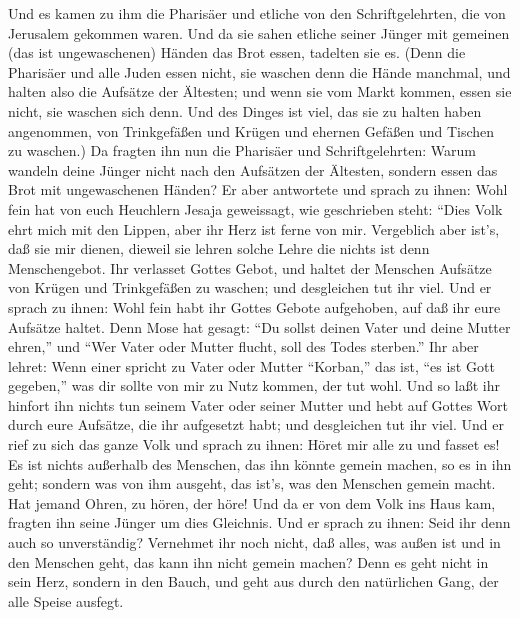  Und es kamen zu ihm die Pharisäer und etliche von den
Schriftgelehrten, die von Jerusalem gekommen waren.  Und da
sie sahen etliche seiner Jünger mit gemeinen (das ist ungewaschenen)
Händen das Brot essen, tadelten sie es.  (Denn die Pharisäer
und alle Juden essen nicht, sie waschen denn die Hände manchmal, und
halten also die Aufsätze der Ältesten;  und wenn sie vom
Markt kommen, essen sie nicht, sie waschen sich denn. Und des Dinges ist
viel, das sie zu halten haben angenommen, von Trinkgefäßen und Krügen
und ehernen Gefäßen und Tischen zu waschen.)  Da fragten ihn
nun die Pharisäer und Schriftgelehrten: Warum wandeln deine Jünger nicht
nach den Aufsätzen der Ältesten, sondern essen das Brot mit
ungewaschenen Händen?  Er aber antwortete und sprach zu
ihnen: Wohl fein hat von euch Heuchlern Jesaja geweissagt, wie
geschrieben steht: ``Dies Volk ehrt mich mit den Lippen, aber ihr Herz
ist ferne von mir.  Vergeblich aber ist's, daß sie mir
dienen, dieweil sie lehren solche Lehre die nichts ist denn
Menschengebot.  Ihr verlasset Gottes Gebot, und haltet der
Menschen Aufsätze von Krügen und Trinkgefäßen zu waschen; und
desgleichen tut ihr viel.  Und er sprach zu ihnen: Wohl fein
habt ihr Gottes Gebote aufgehoben, auf daß ihr eure Aufsätze haltet.
 Denn Mose hat gesagt: ``Du sollst deinen Vater und deine
Mutter ehren,'' und ``Wer Vater oder Mutter flucht, soll des Todes
sterben.''  Ihr aber lehret: Wenn einer spricht zu Vater
oder Mutter ``Korban,'' das ist, ``es ist Gott gegeben,'' was dir sollte
von mir zu Nutz kommen, der tut wohl.  Und so laßt ihr
hinfort ihn nichts tun seinem Vater oder seiner Mutter  und
hebt auf Gottes Wort durch eure Aufsätze, die ihr aufgesetzt habt; und
desgleichen tut ihr viel.  Und er rief zu sich das ganze
Volk und sprach zu ihnen: Höret mir alle zu und fasset es! 
Es ist nichts außerhalb des Menschen, das ihn könnte gemein machen, so
es in ihn geht; sondern was von ihm ausgeht, das ist's, was den Menschen
gemein macht.  Hat jemand Ohren, zu hören, der höre!
 Und da er von dem Volk ins Haus kam, fragten ihn seine
Jünger um dies Gleichnis.  Und er sprach zu ihnen: Seid ihr
denn auch so unverständig? Vernehmet ihr noch nicht, daß alles, was
außen ist und in den Menschen geht, das kann ihn nicht gemein machen?
 Denn es geht nicht in sein Herz, sondern in den Bauch, und
geht aus durch den natürlichen Gang, der alle Speise ausfegt.
